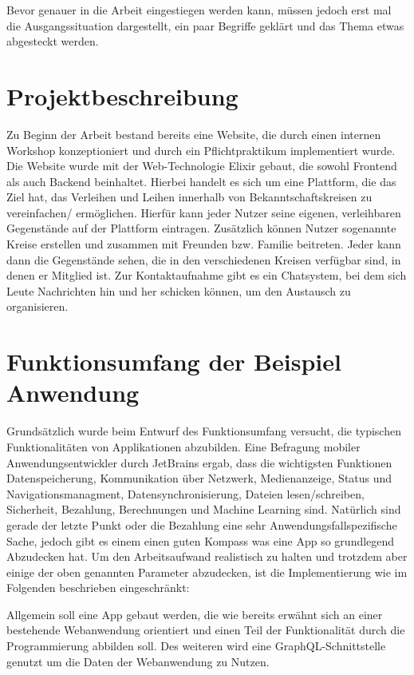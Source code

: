 Bevor genauer in die Arbeit eingestiegen werden kann, müssen jedoch erst mal die Ausgangssituation dargestellt, ein paar Begriffe geklärt und das Thema etwas abgesteckt werden.

\section{Projektbeschreibung}
Zu Beginn der Arbeit bestand bereits eine Website, die durch einen internen Workshop konzeptioniert und durch ein Pflichtpraktikum implementiert wurde. Die Website wurde mit der Web-Technologie Elixir gebaut, die sowohl Frontend als auch Backend beinhaltet. Hierbei handelt  es sich um eine Plattform, die das Ziel hat, das Verleihen und Leihen innerhalb von Bekanntschaftskreisen zu vereinfachen/ ermöglichen. Hierfür kann jeder Nutzer seine eigenen, verleihbaren Gegenstände auf der Plattform eintragen. Zusätzlich können Nutzer sogenannte Kreise erstellen und zusammen mit Freunden bzw. Familie beitreten. Jeder kann dann die Gegenstände sehen, die in den verschiedenen Kreisen verfügbar sind, in denen er Mitglied ist. Zur Kontaktaufnahme gibt es ein Chatsystem, bei dem sich Leute Nachrichten hin und her schicken können, um den Austausch zu organisieren.

\section{Funktionsumfang der Beispiel Anwendung}
Grundsätzlich wurde beim Entwurf des Funktionsumfang versucht, die typischen Funktionalitäten von Applikationen abzubilden. Eine Befragung mobiler Anwendungsentwickler durch JetBrains ergab, dass die wichtigsten Funktionen Datenspeicherung, Kommunikation über Netzwerk, Medienanzeige, Status und Navigationsmanagment, Datensynchronisierung, Dateien lesen/schreiben, Sicherheit, Bezahlung, Berechnungen und Machine Learning sind\cite{JetBrains_miscellaneous_2021}. Natürlich sind gerade der letzte Punkt oder die Bezahlung eine sehr Anwendungsfallspezifische Sache, jedoch gibt es einem einen guten Kompass was eine App so grundlegend Abzudecken hat.
Um den Arbeitsaufwand realistisch zu halten und trotzdem aber einige der oben genannten Parameter abzudecken, ist die Implementierung wie im Folgenden beschrieben eingeschränkt:

Allgemein soll eine App gebaut werden, die wie bereits erwähnt sich an einer bestehende Webanwendung orientiert und einen Teil der Funktionalität durch die Programmierung abbilden soll. Des weiteren wird eine GraphQL-Schnittstelle genutzt um die Daten der Webanwendung zu Nutzen. 

